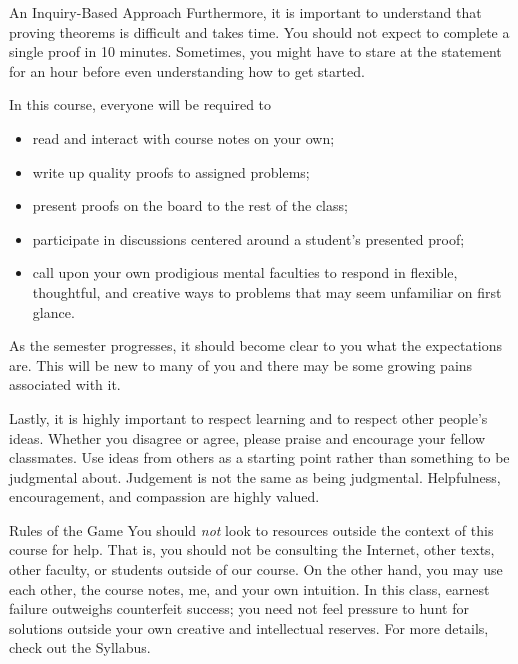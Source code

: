\begin{section}{An Inquiry-Based Approach}
Furthermore, it is important to understand that proving theorems is difficult and takes time. You should not expect to complete a single proof in 10 minutes. Sometimes, you might have to stare at the statement for an hour before even understanding how to get started. 

In this course, everyone will be required to
\begin{itemize}
\item read and interact with course notes on your own;
\item write up quality proofs to assigned problems;
\item present proofs on the board to the rest of the class;
\item participate in discussions centered around a student's presented proof;
\item call upon your own prodigious mental faculties to respond in flexible, thoughtful, and creative ways to problems that may seem unfamiliar on first glance.
\end{itemize}
\noindent As the semester progresses, it should become clear to you what the expectations are. This will be new to many of you and there may be some growing pains associated with it.

Lastly, it is highly important to respect learning and to respect other people's ideas.  Whether you disagree or agree, please praise and encourage your fellow classmates.  Use ideas from others as a starting point rather than something to be judgmental about.  Judgement is not the same as being judgmental.  Helpfulness, encouragement, and compassion are highly valued.

\end{section}

\begin{section}{Rules of the Game}
You should \emph{not} look to resources outside the context of this course for help. That is, you should not be consulting the Internet, other texts, other faculty, or students outside of our course. On the other hand, you may use each other, the course notes, me, and your own intuition.  In this class, earnest failure outweighs counterfeit success; you need not feel pressure to hunt for solutions outside your own creative and intellectual reserves.  For more details, check out the Syllabus.

\end{section}

